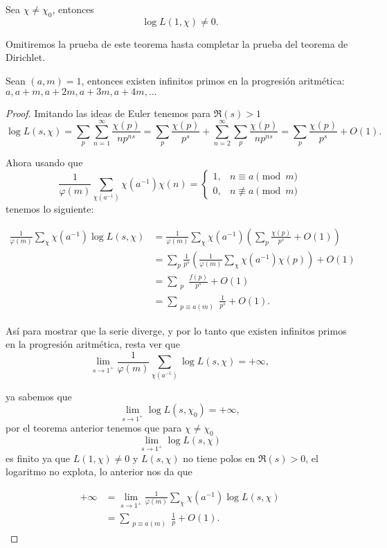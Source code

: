 \begin{theorem}[Dirichlet]
Sea $\chi \neq \chi_0$, entonces \[
\log L(1, \chi) \neq 0.
\]
\end{theorem}

Omitiremos la prueba de este teorema hasta completar la prueba del teorema de Dirichlet.


\begin{theorem}[Dirichlet 1837]
Sean $(a, m) = 1$, entonces existen infinitos primos en la progresión aritmética: $a, a + m, a + 2m, a + 3m, a + 4m, \dots$

\end{theorem}

\begin{proof}
Imitando las ideas de Euler tenemos para $\Re(s) > 1$
\[
\log L(s, \chi) = \sum_p \sum_{n=1}^{\infty} \frac{\chi(p)}{np^{ns}} = \sum_p \frac{\chi(p)}{p^s} + \sum_{n=2}^{\infty} \sum_p \frac{\chi(p)}{np^{ns}} = \sum_p \frac{\chi(p)}{p^s} + O(1).
\]

Ahora usando que
\[
\frac{1}{\varphi(m)} \sum_{\chi (a^{-1})} \chi(a^{-1}) \chi(n) = 
\begin{cases}
1, & n \equiv a \pmod{m} \\
0, & n \not\equiv a \pmod{m}
\end{cases}
\]
tenemos lo siguiente:

\begin{align*}
    \frac{1}{\varphi(m)} \sum_{\chi} \chi(a^{-1}) \log L(s, \chi)&= \frac{1}{\varphi(m)} \sum_{\chi} \chi(a^{-1})\left(\sum_p \frac{\chi(p)}{p^s} + O(1)\right)\\
    &= \sum_p \frac{1}{p^s} \left( \frac{1}{\varphi(m)} \sum_{\chi} \chi(a^{-1}) \chi(p) \right) + O(1)\\
&= \sum_{\substack{p}} \frac{f(p)}{p^s} + O(1)\\
&=\sum_{\substack{p \equiv a(m)}} \frac{1}{p^s} + O(1)
.\end{align*}

Así para mostrar que la serie diverge, y por lo tanto que existen infinitos primos en la progresión aritmética, resta ver que
\[
\lim_{s \to 1^+} \frac{1}{\varphi(m)} \sum_{\chi (a^{-1})} \log L(s, \chi) = +\infty,
\]

ya sabemos que
\[
\lim_{s \to 1^+} \log L(s, \chi_0) = +\infty,
\]
por el teorema anterior tenemos que para $\chi \neq \chi_0$
\[
\lim_{s \to 1^+} \log L(s, \chi)
\]
es finito ya que $L(1,\chi)\neq 0$ y $L(s,\chi)$ no tiene polos en $\Re(s)>0$, el logaritmo no explota, lo anterior nos da que 

\begin{align*}
     +\infty&=\lim_{s \to 1^{+}} \frac{1}{\varphi(m)} \sum_{\chi} \chi(a^{-1}) \log L(s, \chi)\\
     &=\sum_{\substack{p \equiv a(m)}} \frac{1}{p} + O(1)
.\end{align*}
\end{proof}

